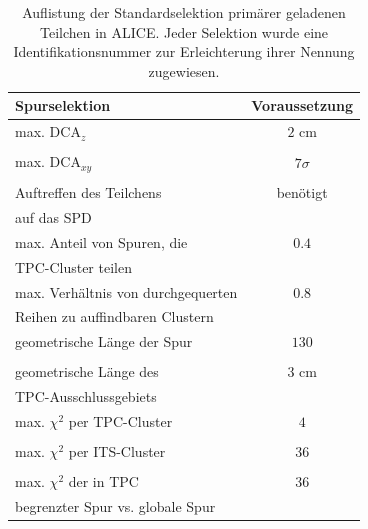 \documentclass[12pt,a4paper]{report}
\begin{document}
\begin{table}
\centering
\begin{tabular}{|l c|}
\hline
 \textbf{Spurselektion} & \textbf{Voraussetzung} \\
\hline
\hline
\rowcolor{mygray}  max. $\mathrm{DCA}_{z}$ & $2 $ cm\\
\rowcolor{mygray}   & \\

 max. $\mathrm{DCA}_{xy}$ & $7\sigma$ \\
 & \\

\rowcolor{mygray}  Auftreffen des Teilchens & benötigt \\
\rowcolor{mygray}  auf das SPD &\\

max. Anteil von Spuren, die &  $0.4$\\
  TPC-Cluster teilen & \\

\rowcolor{mygray} max. Verhältnis von durchgequerten & $0.8$ \\
\rowcolor{mygray}    Reihen zu auffindbaren Clustern & \\

geometrische Länge der Spur & $130$ \\
  & \\

\rowcolor{mygray}  geometrische Länge des & $3 $ cm\\
\rowcolor{mygray}   TPC-Ausschlussgebiets & \\

max. $\chi^2$ per TPC-Cluster & $4$ \\
  &  \\

\rowcolor{mygray}  max. $\chi^2$ per ITS-Cluster  & $36$ \\
\rowcolor{mygray}    & \\

max. $\chi^2$ der in TPC  & $36$ \\
 begrenzter Spur vs. globale Spur & \\
\hline
\end{tabular}
\caption{Auflistung der Standardselektion primärer geladenen Teilchen in \hspace{2cm} ALICE. Jeder Selektion wurde eine Identifikationsnummer zur Erleichterung ihrer Nennung zugewiesen.}
\label{tab:Cuts}
\end{table}
\end{document}

